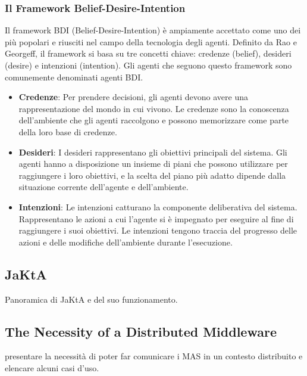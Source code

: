 \subsubsection{Il Framework Belief-Desire-Intention}
Il framework BDI (Belief-Desire-Intention) è ampiamente accettato come uno dei più popolari e riusciti nel campo della tecnologia degli agenti. Definito da Rao e Georgeff, il framework si basa su tre concetti chiave: credenze (belief), desideri (desire) e intenzioni (intention). Gli agenti che seguono questo framework sono comunemente denominati agenti BDI.

\begin{itemize}
    \item \textbf{Credenze}: Per prendere decisioni, gli agenti devono avere una rappresentazione del mondo in cui vivono. Le credenze sono la conoscenza dell'ambiente che gli agenti raccolgono e possono memorizzare come parte della loro base di credenze.
    \item \textbf{Desideri}: I desideri rappresentano gli obiettivi principali del sistema. Gli agenti hanno a disposizione un insieme di piani che possono utilizzare per raggiungere i loro obiettivi, e la scelta del piano più adatto dipende dalla situazione corrente dell'agente e dell'ambiente.
    \item \textbf{Intenzioni}: Le intenzioni catturano la componente deliberativa del sistema. Rappresentano le azioni a cui l'agente si è impegnato per eseguire al fine di raggiungere i suoi obiettivi. Le intenzioni tengono traccia del progresso delle azioni e delle modifiche dell'ambiente durante l'esecuzione.
\end{itemize}

\subsection{JaKtA}
Panoramica di JaKtA e del suo funzionamento.

\subsection{The Necessity of a Distributed Middleware}
presentare la necessità di poter far comunicare i MAS in un contesto distribuito e elencare alcuni casi d'uso.
